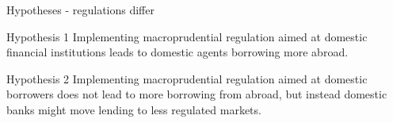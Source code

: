 \documentclass{beamer}
\begin{document}
\begin{frame}{Hypotheses - regulations differ}
\begin{block}{Hypothesis 1} 
Implementing macroprudential regulation aimed at domestic financial institutions leads to domestic agents borrowing more abroad.
\end{block}

\begin{block}{Hypothesis 2} 
Implementing macroprudential regulation aimed at domestic borrowers does not lead to more borrowing from abroad, but instead domestic banks might move lending to less regulated markets.
\end{block}
\end{frame}

\end{document}
